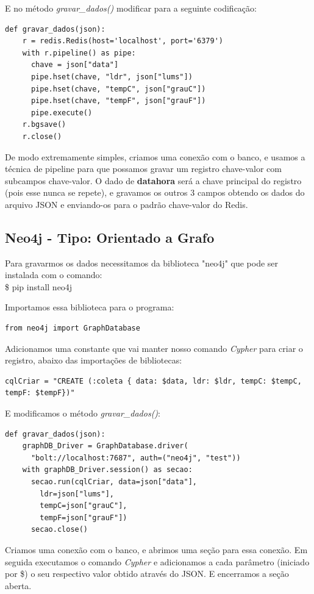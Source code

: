\documentclass[a4paper,11pt]{article}
\begin{document}
E no método \textit{gravar\_dados()} modificar para a seguinte codificação:
\begin{lstlisting}[]
  def gravar_dados(json):
    r = redis.Redis(host='localhost', port='6379')
    with r.pipeline() as pipe:
      chave = json["data"]
      pipe.hset(chave, "ldr", json["lums"])
      pipe.hset(chave, "tempC", json["grauC"])
      pipe.hset(chave, "tempF", json["grauF"])
      pipe.execute()
    r.bgsave()
    r.close()
\end{lstlisting}

De modo extremamente simples, criamos uma conexão com o banco, e usamos a técnica de pipeline para que possamos gravar um registro chave-valor com subcampos chave-valor. O dado de \textbf{datahora} será a chave principal do registro (pois esse nunca se repete), e gravamos os outros 3 campos obtendo os dados do arquivo JSON e enviando-os para o padrão chave-valor do Redis.

\subsection*{Neo4j - Tipo: Orientado a Grafo}
Para gravarmos os dados necessitamos da biblioteca "neo4j" que pode ser instalada com o comando: \\
{\ttfamily\$ pip install neo4j}

Importamos essa biblioteca para o programa:
\begin{lstlisting}[]
from neo4j import GraphDatabase
\end{lstlisting}

Adicionamos uma constante que vai manter nosso comando \textit{Cypher} para criar o registro, abaixo das importações de bibliotecas:
\begin{lstlisting}[]
cqlCriar = "CREATE (:coleta { data: $data, ldr: $ldr, tempC: $tempC, tempF: $tempF})"	
\end{lstlisting}

E modificamos o método \textit{gravar\_dados()}:
\begin{lstlisting}[]
  def gravar_dados(json):
    graphDB_Driver = GraphDatabase.driver(
      "bolt://localhost:7687", auth=("neo4j", "test"))
    with graphDB_Driver.session() as secao:
      secao.run(cqlCriar, data=json["data"],
        ldr=json["lums"], 
        tempC=json["grauC"], 
        tempF=json["grauF"])
      secao.close()
\end{lstlisting}

Criamos uma conexão com o banco, e abrimos uma seção para essa conexão. Em seguida executamos o comando \textit{Cypher} e adicionamos a cada parâmetro (iniciado por {\ttfamily\$}) o seu respectivo valor obtido através do JSON. E encerramos a seção aberta.
\end{document}
